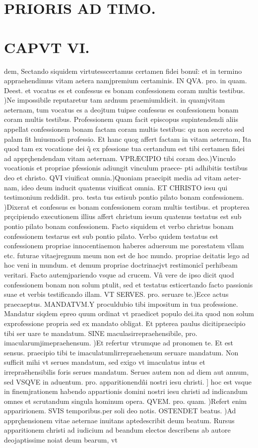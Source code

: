 \documentclass{article}
\begin{document}
\begin{pages}
\section*{PRIORIS AD TIMO. }
\section*{CAPVT VI. }\pstart dem, Sectando siquidem virtutesscertamus certamen fidei bonuĩ: et in termino appraehendimus vitam aetera namjpremium certaminis. IN QVA. pro. in quam. Deest. et vocatus es et confessus es bonam confessionem coram multis testibus. )Ne impossibile reputaretur tam ardnum praemiumldicit. in quamjvitam aeternam, tum vocatus es a deojtum tuipse confessus es confessionem bonam coram multis testibus. Professionem quam facit episcopus supintendendi aliis appellat confessionem bonam factam coram multis testibus: qu non secreto sed palam fit huiusmodi professio. Et hanc quog affert factam in vitam aeternam, Ita quod tam ex vocatione dei q̃ ex pfessione tua certandum est tibi certamen fidei ad apprçhendendam vitam aeternam. VPRÆCIPIO tibi coram deo.)Vinculo vocationis et propriae pfessionis adiungit vinculum praece- pti adhibitis testibus deo et christo. QVI viuificat omnia.)Quoniam praecipit media ad vitam aeter- nam, ideo deum inducit quatenus viuificat omnia. ET CHRISTO iesu qui testimonium reddidit. pro. testa tus estisub pontio pilato bonam confessionem. )Dixerat et confessus es bonam confessionem coram multis testibus. et propterea prçcipiendo executionem illius affert christum iesum quatenus testatus est sub pontio pilato bonam confessionem. Facto siquidem et verbo christus bonam confessionem testarus est sub pontio pilato. Verbo quidem testatus est confessionem propriae innocentiaemon haberes aduersum me porestatem vllam etc. futurae vitaejregnum meum non est de hoc mundo. propriae deitatis lego ad hoc veni in mundum. et demum propriae doctrinaejvt restimonicĩ perhibeam veritari. Facto autemjpariendo vsque ad crucem. Vñ vere de ipso dicit quod confessionem bonam non solum ptulit, sed et testatus esticertando facto passionis suae et verbis testificando illam. VT SERVES. pro. seruare te.)Ecce actus praecaeptus. MANDATVM.Y proculdubio tibi impositum in tua professione. Mandatur siqdem epreo quum ordinat vt praedicet populo dei.ita quod non solum exprofessione propria sed ex mandato obligat. Et ppterea paulus dicitipraecipio tibi ser uare te mandatum. SINE maculasirrepraehensibile, pro. imacularumjimepraehensum. )Et refertur vtrumque ad pronomen te. Et est sensus. praecipio tibi te imaculatumlirrepraehensum seruare mandatum. Non sufficit mihi vt serues mandatum, sed exigo vt imaculatus intus et irrepraẽhensibilis foris serues mandatum. Serues autem non ad diem aut annum, sed VSQVE in aduentum. pro. apparitionendñi nostri iesu christi. ] hoc est vsque  in finemjrationem habendo appartionis domini nostri iesu christi ad indicandum omnes et scrutandum singula hominum opera. QVEM. pro. quam. )Refert enim apparirionem. SVIS temporibus.per soli deo notis. OSTENDET beatus. )Ad apprçhensionem vitae aeternae inuitans aptedescribit deum beatum. Rursus apparitionem christi ad iudicium ad beandum electos describens ab autore deojaptissime noiat deum bearum, vt 
\end{pages}
\end{document}
